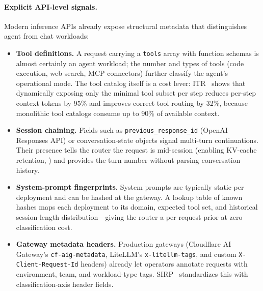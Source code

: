 \paragraph{Explicit API-level signals.}
Modern inference APIs already expose structural metadata that
distinguishes agent from chat workloads:
\begin{itemize}[nosep]
  \item \textbf{Tool definitions.}  A request carrying a \texttt{tools}
        array with function schemas is almost certainly an agent
        workload; the number and types of tools (code execution,
        web search, MCP connectors) further classify the agent's
        operational mode.  The tool catalog itself is a cost lever:
        ITR~\cite{itr2026} shows that dynamically exposing only the
        minimal tool subset per step reduces per-step context tokens
        by 95\% and improves correct tool routing by 32\%, because
        monolithic tool catalogs consume up to 90\% of available
        context.
  \item \textbf{Session chaining.}  Fields such as
        \texttt{previous\_response\_id} (OpenAI Responses API) or
        conversation-state objects signal multi-turn continuations.
        Their presence tells the router the request is mid-session
        (enabling KV-cache retention, ) and
        provides the turn number without parsing conversation history.
  \item \textbf{System-prompt fingerprints.}  System prompts are
        typically static per deployment and can be hashed at the
        gateway.  A lookup table of known hashes maps each deployment
        to its domain, expected tool set, and historical session-length
        distribution---giving the router a per-request prior at
        zero classification cost.
  \item \textbf{Gateway metadata headers.}  Production gateways
        (Cloudflare AI Gateway's \texttt{cf-aig-metadata},
        LiteLLM's \texttt{x-litellm-tags}, and custom
        \texttt{X-Client-Request-Id} headers) already let operators
        annotate requests with environment, team, and workload-type
        tags.  SIRP~\cite{sirp2025} standardizes this with
        classification-axis header fields.
\end{itemize}


